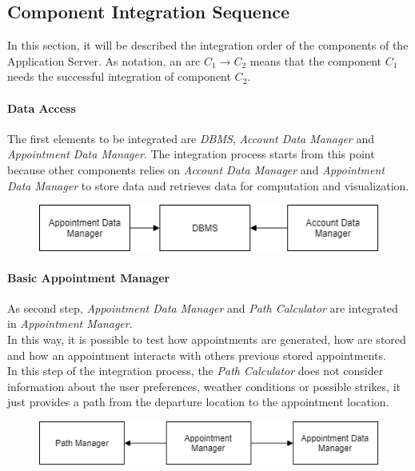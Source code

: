 
\subsection{Component Integration Sequence}

In this section, it will be described the integration order of the components of the Application Server.
As notation, an arc $C_1 \rightarrow C_2$ means that the component $C_1$ needs the successful integration of component $C_2$.


\paragraph*{Data Access\\}
The first elements to be integrated are \emph{DBMS}, \emph{Account Data Manager} and \emph{Appointment Data Manager}. 
The integration process starts from this point because other components relies on \emph{Account Data Manager} and \emph{Appointment Data Manager} to store data and retrieves data for computation and visualization.
\begin{figure}[H]
	\includegraphics[width=\textwidth, keepaspectratio=true]{Img/FirstStep}
\end{figure}

\paragraph*{Basic Appointment Manager\\}
As second step, \emph{Appointment Data Manager} and \emph{Path Calculator} are integrated in \emph{Appointment Manager}.\\
In this way, it is possible to test how appointments are generated, how are stored and how an appointment interacts with others previous stored appointments.\\
In this step of the integration process, the \emph{Path Calculator} does not consider information about the user preferences, weather conditions or possible strikes, it just provides a path from the departure location to the appointment location.

\begin{figure}[H]
	\includegraphics[width=\textwidth, keepaspectratio=true]{Img/SecondStep}
\end{figure}


